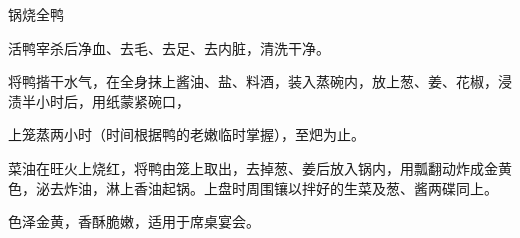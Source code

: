 \begin{recipe}{锅烧全鸭}

\ingredients


\preparation

\step 活鸭宰杀后净血、去毛、去足、去内脏，清洗干净。

\step 将鸭揩干水气，在全身抹上酱油、盐、料酒，装入蒸碗内，放上葱、姜、花椒，浸
渍半小时后，用纸蒙紧碗口，

上笼蒸两小时（时间根据鸭的老嫩临时掌握），至𤆵为止。

\step 菜油在旺火上烧红，将鸭由笼上取出，去掉葱、姜后放入锅内，用瓢翻动炸成金黄
色，泌去炸油，淋上香油起锅。上盘时周围镶以拌好的生菜及葱、酱两碟同上。

\features

色泽金黄，香酥脆嫩，适用于席桌宴会。

\end{recipe}

